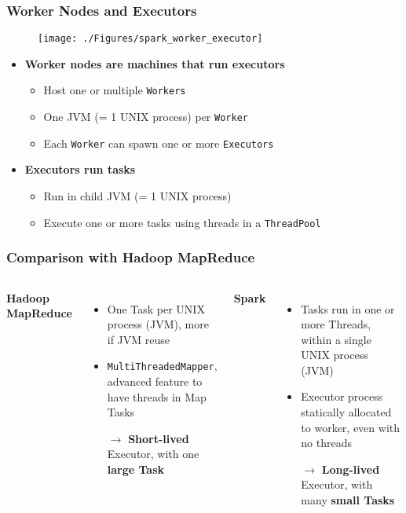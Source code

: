 \begin{frame}
\frametitle{Worker Nodes and Executors}
\begin{figure}[h]
  \centering
  \texttt{[image: ./Figures/spark\_worker\_executor]}
  \label{fig:spark_shuffle_sort}
\end{figure}

\begin{itemize}
	\item {\bf Worker nodes are machines that run executors}
	\begin{itemize}
		\item Host one or multiple \texttt{Workers}
		\item One JVM (= 1 UNIX process) per \texttt{Worker}
		\item Each \texttt{Worker} can spawn one or more \texttt{Executors}
	\end{itemize}

	\item {\bf Executors run tasks}
	\begin{itemize}
		\item Run in child JVM (= 1 UNIX process)
		\item Execute one or more tasks using threads in a \texttt{ThreadPool}
	\end{itemize}
\end{itemize}
\end{frame}

\begin{frame}
\frametitle{Comparison with Hadoop MapReduce}
\begin{columns}[t, onlytextwidth]
	{\bf Hadoop MapReduce}
	\begin{itemize}
		\item One Task per UNIX process (JVM), more if JVM reuse
		\item \texttt{MultiThreadedMapper}, advanced feature to have threads in Map Tasks
		\item[$\to$] {\bf Short-lived} Executor, with one {\bf large Task}
	\end{itemize}

	
	{\bf Spark}		
	\begin{itemize}
		\item Tasks run in one or more Threads, within a single UNIX process (JVM)
		\item Executor process statically allocated to worker, even with no threads
		\item[$\to$] {\bf Long-lived} Executor, with many {\bf small Tasks}
	\end{itemize}

\end{columns}

\end{frame}

